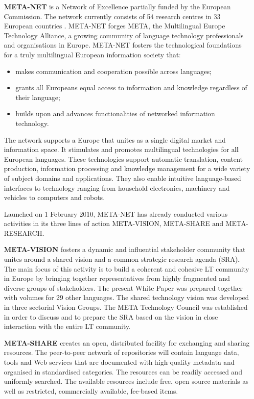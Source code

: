 \begin{multicols}{2}

\textbf{META-NET} is a Network of Excellence partially funded by the European Commission. The network currently consists of 54 research centres in 33 European countries \cite{rehm2011}. META-NET forges META, the Multilingual Europe Technology Alliance, a growing community of language technology professionals and organisations in Europe. META-NET fosters the technological foundations for a truly multilingual European information society that: 

\begin{itemize}
\item makes communication and cooperation possible across languages;
\item grants all Europeans equal access to information and knowledge regardless of their language; 
\item builds upon and advances functionalities of networked information technology.
\end{itemize}

The network supports a Europe that unites as a single digital market and information space. It stimulates and promotes multilingual technologies for all European languages. These technologies support automatic translation, content production, information processing and knowledge management for a wide variety of subject domains and applications. They also enable intuitive language-based interfaces to technology ranging from household electronics, machinery and vehicles to computers and robots.

Launched on 1 February 2010, META-NET has already conducted various activities in its three lines of action META-VISION, META-SHARE and META-RESEARCH. 

\textbf{META-VISION} fosters a dynamic and inﬂuential stakeholder community that unites around a shared vision and a common strategic research agenda (SRA). The main focus of this activity is to build a coherent and cohesive LT community in Europe by bringing together representatives from highly fragmented and diverse groups of stakeholders. The present White Paper was prepared together with volumes for 29 other languages. The shared technology vision was developed in three sectorial Vision Groups. The META Technology Council was established in order to discuss and to prepare the SRA based on the vision in close interaction with the entire LT community.

\textbf{META-SHARE} creates an open, distributed facility for exchanging and sharing resources. The peer-to-peer network of repositories will contain language data, tools and Web services that are documented with high-quality metadata and organised in standardised categories. The resources can be readily accessed and uniformly searched. The available resources include free, open source materials as well as restricted, commercially available, fee-based items.


\end{multicols}
